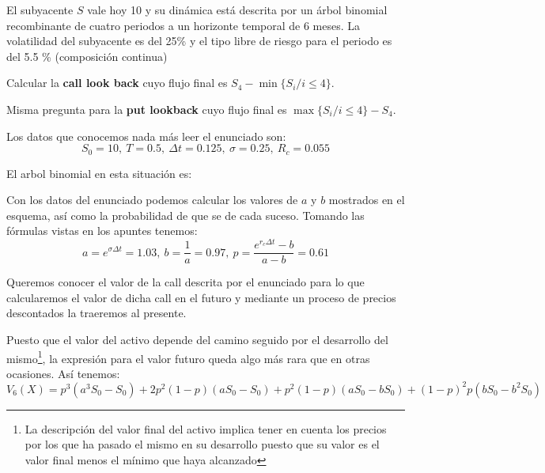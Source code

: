 \begin{problem}[1]
El subyacente $S$ vale hoy 10 y su dinámica está descrita por un árbol binomial recombinante de cuatro periodos a un horizonte temporal de 6 meses. La volatilidad del subyacente es del 25\% y el tipo libre de riesgo para el periodo es del 5.5 \% (composición continua)

\ppart Calcular la \textbf{call look back} cuyo flujo final es $S_4-\min\{S_i/ i\leq 4\}$.

\ppart Misma pregunta para la \textbf{put lookback} cuyo flujo final es $\max\{S_i / i \leq 4\}-S_4$.
\solution


Los datos que conocemos nada más leer el enunciado son:
\[S_0=10, \ T=0.5, \ Δt = 0.125, \ σ=0.25, \ R_c=0.055\]

El arbol binomial en esta situación es:
\begin{center}
\end{center}

Con los datos del enunciado podemos calcular los valores de $a$ y $b$ mostrados en el esquema, así como la probabilidad de que se de cada suceso. Tomando las fórmulas vistas en los apuntes tenemos:
\[a=e^{σΔt} = 1.03, \ b = \frac{1}{a} = 0.97, \ p = \frac{e^{r_cΔt}-b}{a-b}=0.61\]

\spart
Queremos conocer el valor de la call descrita por el enunciado para lo que calcularemos el valor de dicha call en el futuro y mediante un proceso de precios descontados la traeremos al presente.

Puesto que el valor del activo depende del camino seguido por el desarrollo del mismo\footnote{La descripción del valor final del activo implica tener en cuenta los precios por los que ha pasado el mismo en su desarrollo puesto que su valor es el valor final menos el mínimo que haya alcanzado}, la expresión para el valor futuro queda algo más rara que en otras ocasiones. Así tenemos:
\[V_6(X) = p^3(a^3S_0-S_0)+2p^2(1-p)(aS_0-S_0)+p^2(1-p)(aS_0-bS_0)+(1-p)^2p(bS_0-b^2S_0)\]


\end{problem}
